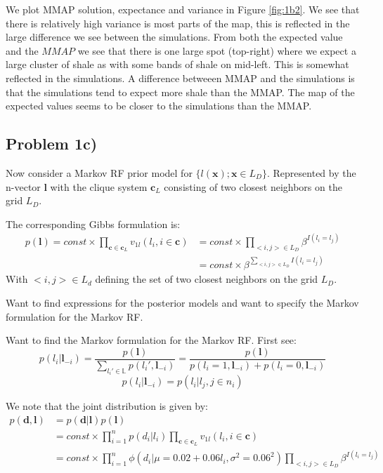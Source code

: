 \documentclass{article}
\newcommand{\vect}[1]{\ensuremath{\boldsymbol{\mathbf{#1}}}}
\begin{document}
	We plot MMAP solution, expectance and variance in Figure \ref{fig:1b2}. We see that there is relatively high variance is most parts of the map, this is reflected in the large difference we see between the simulations. From both the expected value and the $MMAP$ we see that there is one large spot (top-right) where we expect a large cluster of shale as with some bands of shale on mid-left. This is somewhat reflected in the simulations. A difference betweeen MMAP and the simulations is that the simulations tend to expect more shale than the MMAP. The map of the expected values seems to be closer to the simulations than the MMAP. 
	
	\pagebreak
	\subsection*{Problem 1c)}
	Now consider a Markov RF prior model for $\lbrace l(\vect x); \vect x \in L_D \rbrace$. Represented by the n-vector $\vect l$ with the clique system $\vect c_L$ consisting of two closest neighbors on the grid $L_D$. 
	
	The corresponding Gibbs formulation is:
	\begin{equation}
		\begin{split}
		p(\vect l) = const \times \prod_{\vect c \in \vect c_L} v_{1l}(l_i, i \in \vect c) &= const \times \prod_{<i, j>\in L_D} \beta^{I(l_i = l_j)} \\
		&= const \times \beta^{\sum_{<i, j>\in L_D} I(l_i = l_j)}
		\end{split}
	\end{equation}
	With $<i, j> \in L_d$ defining the set of two closest neighbors on the grid $L_D$. 
	
	Want to find expressions for the posterior models and want to specify the Markov formulation for the Markov RF. 
	
	Want to find the Markov formulation for the Markov RF. First see:  
	\begin{equation}
		p(l_i | \vect l_{-i}) = \dfrac{p(\vect l)}{\sum_{l_i' \in \mathbb{L}} p(l_i', \vect l_{-i})} = \dfrac{p(\vect l)}{p(l_i = 1, \vect l_{-i}) +p(l_i = 0, \vect l_{-i})} 
 	\end{equation}
 	\begin{equation}
 		p(l_i | \vect l_{-i}) = p(l_i | l_j, j \in n_i)
 	\end{equation}
	
	We note that the joint distribution is given by:
	\begin{equation}
		\begin{split}
				p(\vect d, \vect l) &= p(\vect d | \vect l)p(\vect l) 
				\\ &= const \times \prod_{i=1}^{n}p(d_i | l_i) \prod_{\vect c \in \vect c_L} v_{1l}(l_i, i \in \vect c)
				\\ &= const \times \prod_{i=1}^{n}  \phi(d_i |\mu = 0.02 + 0.06l_i, \sigma^2 = 0.06^2) \prod_{<i, j>\in L_D} \beta^{I(l_i = l_j)}
		\end{split}
	\end{equation}
	
\end{document}
